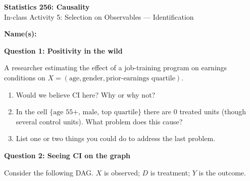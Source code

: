 \documentclass[11pt]{article}
\begin{document}
\begin{center}
{\Large \textbf{Statistics 256: Causality}} \\[6pt]
{\large In-class Activity 5: Selection on Observables --- Identification}
\end{center}

\vspace{4pt}
\noindent\textbf{Name(s):} \hrulefill

\vspace{14pt}

\noindent\textbf{Question 1: Positivity in the wild}

A researcher estimating the effect of a job-training program on earnings conditions on $X = (\text{age}, \text{gender}, \text{prior-earnings quartile})$.  

\begin{enumerate}[label=(\roman*)]
\item Would we believe CI here? Why or why not?
\vspace{2cm}

\item In the cell $\{\text{age 55+, male, top quartile}\}$ there are 0 treated units (though several control units). What problem does this cause? 

\vspace{1.5cm}

\item List one or two things you could do to address the last problem. 

\vspace{2cm}

\end{enumerate}


\noindent\textbf{Question 2: Seeing CI on the graph}

\medskip
\noindent Consider the following DAG.  $X$ is observed; $D$ is treatment; $Y$ is the outcome.

\begin{center}
\end{center}
\end{document}
